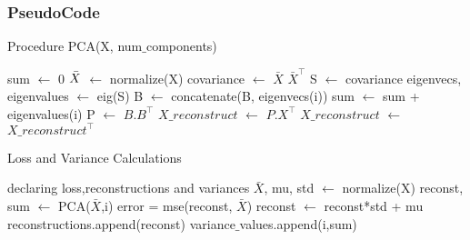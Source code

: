 \documentclass{article}
\begin{document}
\subsubsection {\color{brown} \textbf{PseudoCode}}
\begin{algorithm}
            \caption{Procedure PCA(X, num$\_$components)}
            \begin{algorithmic}
                \STATE sum $\longleftarrow$ 0
                \STATE $\Bar{X}$ $\longleftarrow$ normalize(X)
                \STATE covariance $\longleftarrow$ $\bar{X}$  $\bar{X}^\intercal$
                \STATE S $\longleftarrow$ covariance
                \STATE eigenvecs, eigenvalues $\longleftarrow$ eig(S)
                    \STATE B $\longleftarrow$ concatenate(B, eigenvecs(i))
                    \STATE sum $\longleftarrow$ sum + eigenvalues(i)
                \ENDFOR
                \STATE P $\longleftarrow$ $B.B^\intercal$
                \STATE $X\_reconstruct$ $\longleftarrow$ $P.X^\intercal$
                \STATE $X\_reconstruct$ $\longleftarrow$ $X\_reconstruct^\intercal$
            \end{algorithmic}
        \end{algorithm}
\begin{algorithm}
    \caption{Loss and Variance Calculations}
    \begin{algorithmic}
        \STATE declaring loss,reconstructions and variances
        \STATE $\bar{X}$, mu, std $\longleftarrow$ normalize(X)
            \STATE reconst, sum $\longleftarrow$ PCA($\bar{X}$,i)
            \STATE error = mse(reconst, $\bar{X}$)
            \STATE reconst $\longleftarrow$ reconst*std + mu
            \STATE reconstructions.append(reconst)
            \STATE variance$\_$values.append(i,sum)
        \ENDFOR
    \end{algorithmic}
\end{algorithm}
\\ \\

\newpage
\end{document}
